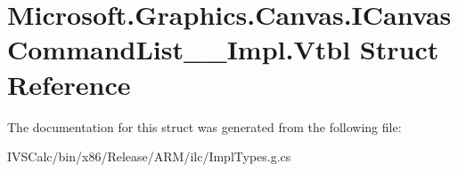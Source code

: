 \hypertarget{struct_microsoft_1_1_graphics_1_1_canvas_1_1_i_canvas_command_list_____impl_1_1_vtbl}{}\section{Microsoft.\+Graphics.\+Canvas.\+I\+Canvas\+Command\+List\+\_\+\+\_\+\+Impl.\+Vtbl Struct Reference}
\label{struct_microsoft_1_1_graphics_1_1_canvas_1_1_i_canvas_command_list_____impl_1_1_vtbl}


The documentation for this struct was generated from the following file\+:\begin{DoxyCompactItemize}
\item 
I\+V\+S\+Calc/bin/x86/\+Release/\+A\+R\+M/ilc/Impl\+Types.\+g.\+cs\end{DoxyCompactItemize}

